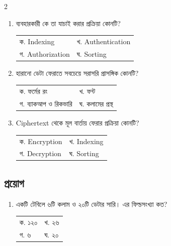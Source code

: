 \begin{multicols}{2}
\begin{enumerate}
\item \begin{minipage}[t]{\linewidth}
ব্যবহারকারী কে তা যাচাই করার প্রক্রিয়া কোনটি?
\par
\begin{tabularx}{\linewidth}{@{}X X@{}}
ক. Indexing & খ. Authentication \\
গ. Authorization & ঘ. Sorting \\
\end{tabularx}
\end{minipage}
\vspace{1pt}

\item \begin{minipage}[t]{\linewidth}
হারানো ডেটা ফেরাতে সবচেয়ে সরাসরি প্রাসঙ্গিক কোনটি?
\par
\begin{tabularx}{\linewidth}{@{}X X@{}}
ক. ফর্মের রং & খ. ফন্ট \\
গ. ব্যাকআপ ও রিকভারি & ঘ. কলামের প্রস্থ \\
\end{tabularx}
\end{minipage}
\vspace{1pt}

\item \begin{minipage}[t]{\linewidth}
Ciphertext থেকে মূল বার্তায় ফেরার প্রক্রিয়া কোনটি?
\par
\begin{tabularx}{\linewidth}{@{}X X@{}}
ক. Encryption & খ. Indexing \\
গ. Decryption & ঘ. Sorting \\
\end{tabularx}
\end{minipage}
\vspace{1pt}

\end{enumerate}
\subsection{প্রয়োগ}
\begin{enumerate}[resume]

\item \begin{minipage}[t]{\linewidth}
একটি টেবিলে ৬টি কলাম ও ২০টি ডেটার সারি। এর ফিল্ডসংখ্যা কত?
\par
\begin{tabularx}{\linewidth}{@{}X X@{}}
ক. ১২০ & খ. ২৬ \\
গ. ৬ & ঘ. ২০ \\
\end{tabularx}
\end{minipage}
\vspace{1pt}


\end{enumerate}
\end{multicols}
